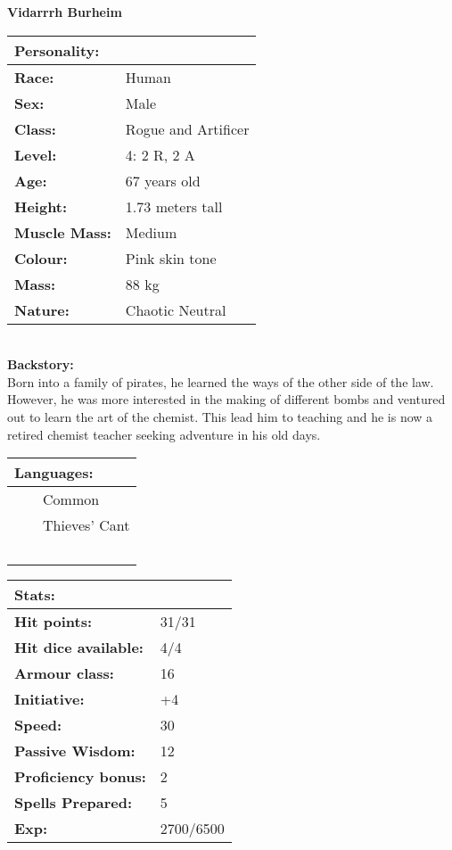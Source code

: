 \documentclass[11pt]{article}
\newcommand{\tabitem}{~~\llap{--}~~}
\begin{document}
	\begin{center}
\Huge \textbf{Vidarrrh Burheim}
	\end{center}
	\begin{multicols}{2}
\noindent \begin{tabularx}{95mm}{@{}l l}
\Large \textbf{Personality:} 	& 						\\
\hline
\textbf{Race:} 					& Human	 				\\
\textbf{Sex:} 					& Male 					\\
\textbf{Class:}					& Rogue and Artificer	\\
\textbf{Level:} 				& 4: 2 R, 2 A			\\
\textbf{Age:} 					& 67 years old			\\
\textbf{Height:} 				& 1.73 meters tall 		\\
\textbf{Muscle Mass:} 			& Medium 				\\
\textbf{Colour:} 				& Pink skin tone	 	\\
\textbf{Mass:} 					& 88 kg			 		\\
\textbf{Nature:} 				& Chaotic Neutral
		\end{tabularx} \\
\textbf{Backstory:} \\
Born into a family of pirates, he learned the ways of the other side of the law. However, he was more interested in the making of different bombs and ventured out to learn the art of the chemist. This lead him to teaching and he is now a retired chemist teacher seeking adventure in his old days.

\noindent \begin{tabularx}{95mm}{@{}l}
{\Large \textbf{Languages:}} \\
\hline
\tabitem Common \\
\tabitem Thieves' Cant \\
\tabitem 
		\end{tabularx}

\vspace{4mm}

\noindent \begin{tabularx}{95mm}{@{}l l}
\Large \textbf{Stats:}		 	& 									\\
\hline
\textbf{Hit points:} 			& 31/31 							\\
\textbf{Hit dice available:}	& 4/4								\\
\textbf{Armour class:} 			& 16							 	\\
\textbf{Initiative:} 			& +4								\\
\textbf{Speed:} 				& 30		 						\\
\textbf{Passive Wisdom:} 		& 12	 							\\
\textbf{Proficiency bonus:}		& 2									\\
\textbf{Spells Prepared:} 		& 5									\\
\textbf{Exp:} 					& 2700/6500
		\end{tabularx}


\end{multicols}
\end{document}

